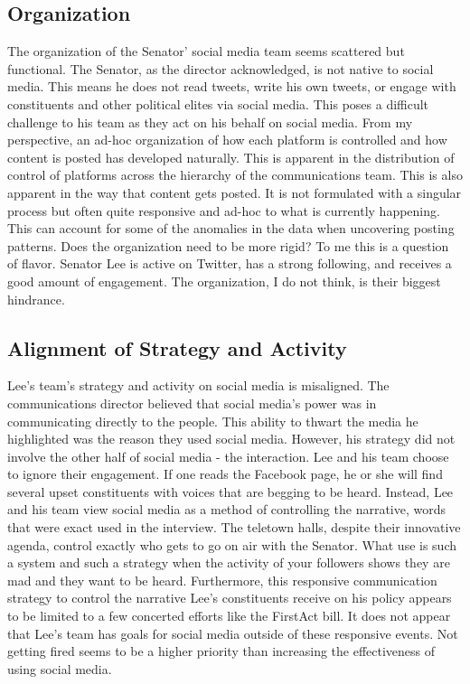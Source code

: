 \documentclass{article}
\begin{document}
\subsection{Organization}
\begin{flushleft}
The organization of the Senator' social media team seems scattered but functional. The Senator, as the director acknowledged, is not native to social media. This means he does not read tweets, write his own tweets, or engage with constituents and other political elites via social media. This poses a difficult challenge to his team as they act on his behalf on social media. From my perspective, an ad-hoc organization of how each platform is controlled and how content is posted has developed naturally. This is apparent in the distribution of control of platforms across the hierarchy of the communications team. This is also apparent in the way that content gets posted. It is not formulated with a singular process but often quite responsive and ad-hoc to what is currently happening. This can account for some of the anomalies in the data when uncovering posting patterns. Does the organization need to be more rigid? To me this is a question of flavor. Senator Lee is active on Twitter, has a strong following, and receives a good amount of engagement. The organization, I do not think, is their biggest hindrance. 
\end{flushleft}
\subsection{Alignment of Strategy and Activity}
\begin{flushleft}
Lee's team's strategy and activity on social media is misaligned. The communications director believed that social media's power was in communicating directly to the people. This ability to thwart the media he highlighted was the reason they used social media. However, his strategy did not involve the other half of social media - the interaction. Lee and his team choose to ignore their engagement. If one reads the Facebook page, he or she will find several upset constituents with voices that are begging to be heard. Instead, Lee and his team view social media as a method of controlling the narrative, words that were exact used in the interview. The teletown halls, despite their innovative agenda, control exactly who gets to go on air with the Senator. What use is such a system and such a strategy when the activity of your followers shows they are mad and they want to be heard. Furthermore, this responsive communication strategy to control the narrative Lee's constituents receive on his policy appears to be limited to a few concerted efforts like the FirstAct bill. It does not appear that Lee's team has goals for social media outside of these responsive events. Not getting fired seems to be a higher priority than increasing the effectiveness of using social media. 
\end{flushleft}
\end{document}
